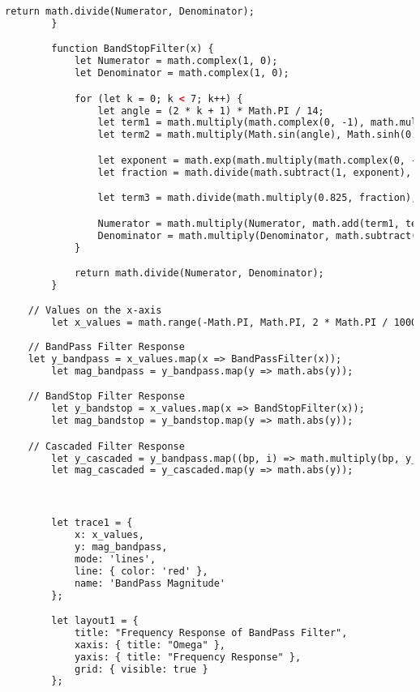 \documentclass{article}
\begin{document}
\begin{lstlisting}[language=HTML, caption=Filter Type Definition]
            return math.divide(Numerator, Denominator);
        }

        function BandStopFilter(x) {
            let Numerator = math.complex(1, 0);
            let Denominator = math.complex(1, 0);

            for (let k = 0; k < 7; k++) {
                let angle = (2 * k + 1) * Math.PI / 14;
                let term1 = math.multiply(math.complex(0, -1), math.multiply(Math.cos(angle), Math.cosh(0.227540122101)));
                let term2 = math.multiply(Math.sin(angle), Math.sinh(0.227540122101));

                let exponent = math.exp(math.multiply(math.complex(0, -1), x));
                let fraction = math.divide(math.subtract(1, exponent), math.add(1, exponent));

                let term3 = math.divide(math.multiply(0.825, fraction), math.add(math.pow(fraction, 2), 0.94815));

                Numerator = math.multiply(Numerator, math.add(term1, term2));
                Denominator = math.multiply(Denominator, math.subtract(math.add(term3, term2), term1));
            }

            return math.divide(Numerator, Denominator);
        }

	// Values on the x-axis
        let x_values = math.range(-Math.PI, Math.PI, 2 * Math.PI / 1000).toArray();
        
	// BandPass Filter Response
	let y_bandpass = x_values.map(x => BandPassFilter(x));
        let mag_bandpass = y_bandpass.map(y => math.abs(y));

	// BandStop Filter Response
        let y_bandstop = x_values.map(x => BandStopFilter(x));
        let mag_bandstop = y_bandstop.map(y => math.abs(y));

	// Cascaded Filter Response
        let y_cascaded = y_bandpass.map((bp, i) => math.multiply(bp, y_bandstop[i]));
        let mag_cascaded = y_cascaded.map(y => math.abs(y));



        let trace1 = {
            x: x_values,
            y: mag_bandpass,
            mode: 'lines',
            line: { color: 'red' },
            name: 'BandPass Magnitude'
        };

        let layout1 = {
            title: "Frequency Response of BandPass Filter",
            xaxis: { title: "Omega" },
            yaxis: { title: "Frequency Response" },
            grid: { visible: true }
        };


\end{lstlisting}
\end{document}
